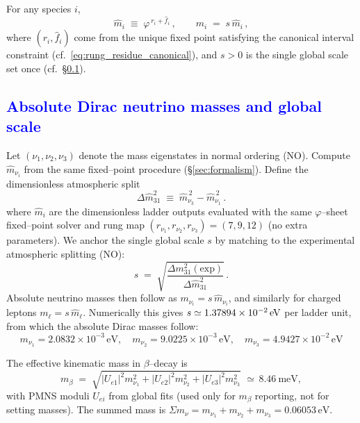 \documentclass[%
 amsmath,amssymb,
 aps,
prb,
floatfix, showkeys
]{revtex4-2}
\newcommand{\modif}[1]{\textcolor{blue}{#1}}
\begin{document}
For any species $i$,
\begin{equation}
  \widehat m_i \;\equiv\; \varphi^{\,r_i+\widehat f_i}\,,\qquad
  m_i \;=\; s\,\widehat m_i\,,
  \label{eq:ladder_output_and_scale}
\end{equation}
where $(r_i,\widehat f_i)$ come from the unique fixed point satisfying the canonical interval constraint (cf.\ \eqref{eq:rung_residue_canonical}), and $s>0$ is the single global scale set once (cf.\ \S\ref{subsec:nu-absolute}).


{\modif{
\subsection{Absolute Dirac neutrino masses and global scale}
\label{subsec:nu-absolute}
}}
Let $(\nu_1,\nu_2,\nu_3)$ denote the mass eigenstates in normal ordering (NO).
Compute $\widehat m_{\nu_i}$ from the same fixed--point procedure (\S\ref{sec:formalism}).
Define the dimensionless atmospheric split
\begin{equation}
  \Delta \widehat m^2_{31} \;\equiv\; \widehat m_{\nu_3}^{\,2} - \widehat m_{\nu_1}^{\,2}\,.
  \label{eq:dimless_atmo}
\end{equation}
where $\widehat m_i$ are the dimensionless ladder outputs evaluated with the same
$\varphi$--sheet fixed--point solver and rung map $(r_{\nu_1},r_{\nu_2},r_{\nu_3})=(7,9,12)$ (no extra parameters).
We anchor the single global scale $s$ by matching to the experimental atmospheric splitting (NO):
\begin{equation}
  s \;=\; \sqrt{\frac{\Delta m^2_{31}(\mathrm{exp})}{\Delta \widehat m^2_{31}}}\,.
  \label{eq:nu_global_scale}
\end{equation}
Absolute neutrino masses then follow as $m_{\nu_i}=s\,\widehat m_{\nu_i}$, and
similarly for charged leptons $m_\ell=s\,\widehat m_\ell$.
 Numerically this gives
$s \simeq 1.37894\times10^{-2}\,{\rm eV}$ per ladder unit, from which the absolute Dirac masses follow:
\[
m_{\nu_1}=2.0832\times10^{-3}\,\text{eV},\quad
m_{\nu_2}=9.0225\times10^{-3}\,\text{eV},\quad
m_{\nu_3}=4.9427\times10^{-2}\,\text{eV}
\]

The effective kinematic mass in $\beta$--decay is
\begin{equation}
  m_\beta \;=\; \sqrt{|U_{e1}|^2 m_{\nu_1}^2 + |U_{e2}|^2 m_{\nu_2}^2 + |U_{e3}|^2 m_{\nu_3}^2}\,\,\simeq\,8.46~\text{meV},
  \label{eq:mbeta_def}
\end{equation}
with PMNS moduli $U_{ei}$ from global fits \cite{NuFIT52} (used only for $m_\beta$ reporting, not for setting masses).
The summed mass is $\Sigma m_\nu = m_{\nu_1}+m_{\nu_2}+m_{\nu_3} = 0.06053\,\text{eV}$.
\end{document}
